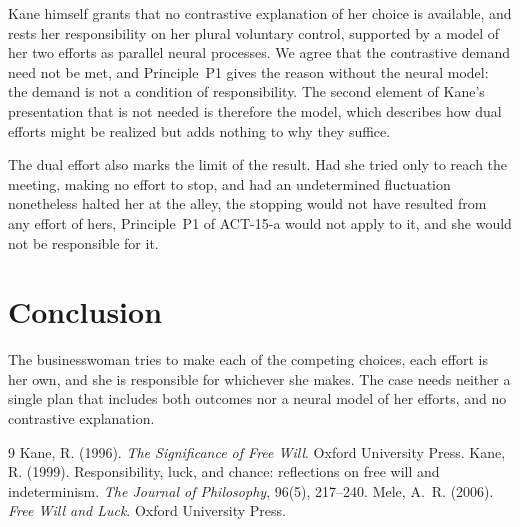\documentclass{situationist-preprint}
\begin{document}
Kane himself grants that no contrastive explanation of her choice is available, and rests her responsibility on her plural voluntary control, supported by a model of her two efforts as parallel neural processes. We agree that the contrastive demand need not be met, and Principle~P1 gives the reason without the neural model: the demand is not a condition of responsibility. The second element of Kane's presentation that is not needed is therefore the model, which describes how dual efforts might be realized but adds nothing to why they suffice.

The dual effort also marks the limit of the result. Had she tried only to reach the meeting, making no effort to stop, and had an undetermined fluctuation nonetheless halted her at the alley, the stopping would not have resulted from any effort of hers, Principle~P1 of ACT-15-a would not apply to it, and she would not be responsible for it.

\section{Conclusion}

The businesswoman tries to make each of the competing choices, each effort is her own, and she is responsible for whichever she makes. The case needs neither a single plan that includes both outcomes nor a neural model of her efforts, and no contrastive explanation.

\begin{thebibliography}{9}\small
{} Kane, R. (1996). \emph{The Significance of Free Will}. Oxford University Press.
 Kane, R. (1999). Responsibility, luck, and chance: reflections on free will and indeterminism. \emph{The Journal of Philosophy}, 96(5), 217--240.
 Mele, A.~R. (2006). \emph{Free Will and Luck}. Oxford University Press.
\end{thebibliography}
\end{document}
